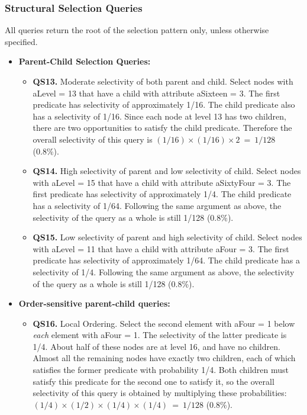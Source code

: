 \subsubsection{Structural Selection Queries}
All queries return the root of the selection pattern only, unless
otherwise specified.
\begin{itemize}
\item
{\bf Parent-Child Selection Queries:}
\begin{itemize}
\item {\bf QS13.} Moderate selectivity of both parent and child.  Select nodes
with {\sf aLevel = 13} that have a child with attribute {\sf aSixteen
= 3}.  The first predicate has selectivity of approximately 1/16. The
child predicate also has a selectivity of 1/16.  Since each node at
level 13 has two children, there are two opportunities to satisfy the
child predicate.  Therefore the overall selectivity of this query is
 $(1/16) \times (1/16) \times 2 ~=~ 1/128$ (0.8\%).

\item {\bf QS14.} High selectivity of parent and low selectivity of child.  Select
nodes with {\sf aLevel = 15} that have a child with attribute {\sf
aSixtyFour = 3}.  The first predicate has selectivity of approximately
1/4.  The child predicate has a selectivity of 1/64.  Following the
same argument as above, the selectivity of the query as a whole is
still 1/128 (0.8\%).

\item {\bf QS15.} Low selectivity of parent and high selectivity of child.  Select
nodes with {\sf aLevel = 11} that have a child with attribute {\sf
aFour = 3}.  The first predicate has selectivity of approximately
1/64.  The child predicate has a selectivity of 1/4.  Following the
same argument as above, the selectivity of the query as a whole is
still 1/128 (0.8\%).
\end{itemize}

\item
{\bf Order-sensitive parent-child queries:}
\begin{itemize}

\item {\bf QS16.} Local Ordering.  Select the second element with {\sf aFour = 1}
below {\em each} element with {\sf aFour = 1}.  The selectivity of the
latter predicate is 1/4.  About half of these nodes are at level 16,
and have no children.  Almost all the remaining nodes have exactly two
children, each of which satisfies the former predicate with
probability 1/4.  Both children must satisfy this predicate for the
second one to satisfy it, so the overall selectivity of this query is
obtained by multiplying these probabilities: $(1/4) \times (1/2) \times
(1/4) \times (1/4) ~=~ 1/128$ (0.8\%).


\end{itemize}
\end{itemize}
